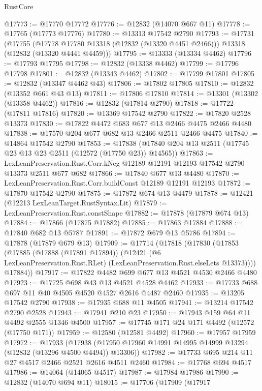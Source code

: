 \begin{lexlean}{RustCore}
\begin{coremodule}
@17773 := @17770 @17772
@17776 := @12832 (@14070 @667 @11)
@17778 := @17765 (@17773 @17776)
@17780 := @13313 @17542 @2790
@17793 := @17731
    (@17755
      (@17778 @17780 @13318 (@12832 (@13320 @4451 @2466)))
      @13318
      (@12832 (@13320 @4441 @4459)))
@17795 := @13333 (@13334 @4462)
@17796 := @17793 @17795
@17798 := @12832 (@13338 @4462)
@17799 := @17796 @17798
@17801 := @12832 (@13343 @4462)
@17802 := @17799 @17801
@17805 := @12832 (@13347 @4462 @43)
@17806 := @17802 @17805
@17810 := @12832 (@13352 @661 @43 @13)
@17811 := @17806 @17810
@17814 := @13301 (@13302 (@13358 @4462))
@17816 := @12832 (@17814 @2790)
@17818 := @17722 (@17811 @17816)
@17820 := @13369 @17542 @2790
@17822 := @17820 @2528 @13373
@17830 := @17822 @4472 @683 @677 @13 @2466 @4475 @2466 @4480
@17838 := @17570 @204 @677 @682 @13 @2466 @2511 @2466 @4475
@17840 := @14864 @17542 @2790
@17853 := @17838 (@17840 @204 @13 @2511 (@17745 @23 @13 @23 @2511 (@12572 (@17750 @23)) @14565))
@17863 := LexLeanPreservation.Rust.Corr.kNeg
    @12189
    @12191
    @12193
    @17542
    @2790
    @13373
    @2511
    @677
    @682
@17866 := @17840 @677 @13 @4480
@17870 := LexLeanPreservation.Rust.Corr.buildConst @12189 @12191 @12193
@17872 := @17870 @17542 @2790
@17875 := @17872 @674 @13 @4479
@17878 := @12421 (@12213 LexLeanTarget.RustSyntax.Lit)
@17879 := LexLeanPreservation.Rust.constShape
@17882 := @17878 (@17879 @674 @13)
@17884 := @17866 (@17875 @17882)
@17885 := @17863 @17884
@17888 := @17840 @682 @13 @5787
@17891 := @17872 @679 @13 @5786
@17894 := @17878 (@17879 @679 @13)
@17909 := @17714
    (@17818
      (@17830
        (@17853
          (@17885
            (@17888 (@17891 @17894))
            (@12421 (@6 LexLeanPreservation.Rust.RLet) (LexLeanPreservation.Rust.elseLets @13373))))
        @17884))
@17917 := @17822 @4482 @699 @677 @13 @4521 @4530 @2466 @4480
@17923 := @17725 @698 @43 @13 @4521 @4528 @4462
@17933 := @17733 @688 @697 @11 @40 @4505 @4520 @4527 @2616 @4487 @2460
@17935 := @13205 @17542 @2790
@17938 := @17935 @688 @11 @4505
@17941 := @13214 @17542 @2790 @2528
@17943 := @17941 @210 @23
@17950 := @17943 @159 @64 @11 @4492 @2555 @1346 @4500
@17957 := @17745 @171 @24 @171 @4492 (@12572 (@17750 @171))
@17959 := @12580 (@12581 @4492)
@17960 := @17957 @17959
@17972 := @17933
    (@17938 (@17950 @17960 @14991 @14995 @14999 @13294 (@12832 (@13296 @4500 @4494)) @13306))
@17982 := @17733 @695 @214 @11 @27 @4517 @2466 @2521 @2616 @4511 @2460
@17984 := @17768 @694 @4517
@17986 := @14064 (@14065 @4517)
@17987 := @17984 @17986
@17990 := @12832 (@14070 @694 @11)
@18015 := @17706
    (@17909
      (@17917

\end{coremodule}
\end{lexlean}
